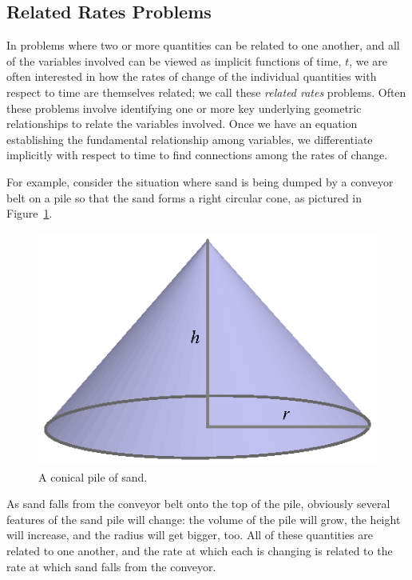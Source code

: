 

\subsection*{Related Rates Problems}

In problems where two or more quantities can be related to one another, and all of the variables involved can be viewed as implicit functions of time, $t$, we are often interested in how the rates of change of the individual quantities with respect to time are themselves related; we call these \emph{related rates} problems.  Often these problems involve identifying one or more key underlying geometric relationships to relate the variables involved.  Once we have an equation establishing the fundamental relationship among variables, we differentiate implicitly with respect to time to find connections among the rates of change.

For example, consider the situation where sand is being dumped by a conveyor belt on a pile so that the sand forms a right circular cone, as pictured in Figure~\ref{F:3.5.ConeEx}.
\begin{figure}[h]
\begin{center}
\includegraphics{figures/3_5_ConeEx.eps}
\caption{A conical pile of sand.} \label{F:3.5.ConeEx}
\end{center}
\end{figure}
As sand falls from the conveyor belt onto the top of the pile, obviously several features of the sand pile will change:  the volume of the pile will grow, the height will increase, and the radius will get bigger, too.  All of these quantities are related to one another, and the rate at which each is changing is related to the rate at which sand falls from the conveyor.


